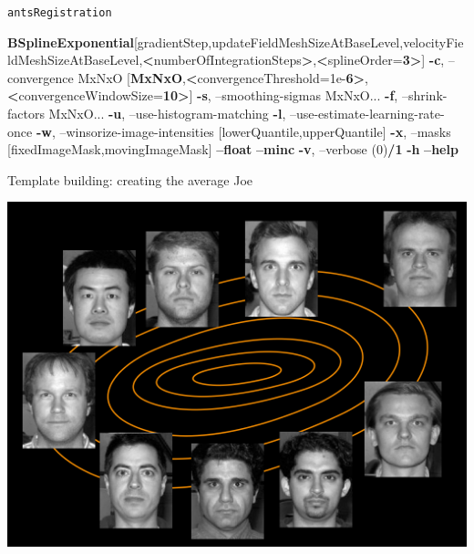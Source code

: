 \documentclass[ignorenonframetext,]{beamer}
\newenvironment{Shaded}{\begin{snugshade}}{\end{snugshade}}
\newcommand{\KeywordTok}[1]{\textcolor[rgb]{0.13,0.29,0.53}{\textbf{{#1}}}}
\newcommand{\NormalTok}[1]{{#1}}
\begin{document}
\begin{frame}[fragile]{\texttt{antsRegistration}}
\begin{Shaded}
\begin{Highlighting}[]
                     \KeywordTok{BSplineExponential}\NormalTok{[gradientStep,updateFieldMeshSizeAtBaseLevel,velocityFieldMeshSizeAtBaseLevel,}\KeywordTok{<}\NormalTok{numberOfIntegrationSteps}\KeywordTok{>}\NormalTok{,}\KeywordTok{<}\NormalTok{splineOrder=}\KeywordTok{3>}\NormalTok{]}
     \KeywordTok{-c}\NormalTok{, --convergence MxNxO}
                       \NormalTok{[}\KeywordTok{MxNxO}\NormalTok{,}\KeywordTok{<}\NormalTok{convergenceThreshold=1e-}\KeywordTok{6>}\NormalTok{,}\KeywordTok{<}\NormalTok{convergenceWindowSize=}\KeywordTok{10>}\NormalTok{]}
     \KeywordTok{-s}\NormalTok{, --smoothing-sigmas MxNxO...}
     \KeywordTok{-f}\NormalTok{, --shrink-factors MxNxO...}
     \KeywordTok{-u}\NormalTok{, --use-histogram-matching}
     \KeywordTok{-l}\NormalTok{, --use-estimate-learning-rate-once}
     \KeywordTok{-w}\NormalTok{, --winsorize-image-intensities [lowerQuantile,upperQuantile]}
     \KeywordTok{-x}\NormalTok{, --masks [fixedImageMask,movingImageMask]}
     \KeywordTok{--float}
     \KeywordTok{--minc}
     \KeywordTok{-v}\NormalTok{, --verbose (0)}\KeywordTok{/1}
     \KeywordTok{-h}
     \KeywordTok{--help}
\end{Highlighting}
\end{Shaded}

\end{frame}

\begin{frame}{Template building: creating the average Joe}

\includegraphics{./Figs/template0.jpg}

\end{frame}
\end{document}
